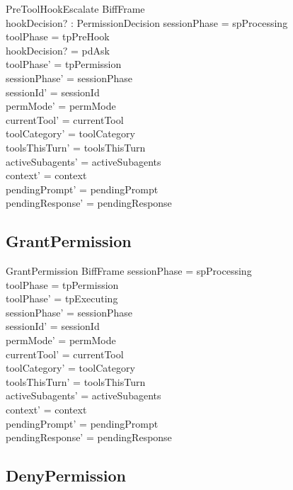 \documentclass[a4paper,10pt,fleqn]{article}
\begin{document}
\begin{schema}{PreToolHookEscalate}
  BiffFrame \\
  hookDecision? : PermissionDecision
  \where
  sessionPhase = spProcessing \\
  toolPhase = tpPreHook \\
  hookDecision? = pdAsk \\
  toolPhase' = tpPermission \\
  sessionPhase' = sessionPhase \\
  sessionId' = sessionId \\
  permMode' = permMode \\
  currentTool' = currentTool \\
  toolCategory' = toolCategory \\
  toolsThisTurn' = toolsThisTurn \\
  activeSubagents' = activeSubagents \\
  context' = context \\
  pendingPrompt' = pendingPrompt \\
  pendingResponse' = pendingResponse
\end{schema}

\subsection{GrantPermission}

\begin{schema}{GrantPermission}
  BiffFrame
  \where
  sessionPhase = spProcessing \\
  toolPhase = tpPermission \\
  toolPhase' = tpExecuting \\
  sessionPhase' = sessionPhase \\
  sessionId' = sessionId \\
  permMode' = permMode \\
  currentTool' = currentTool \\
  toolCategory' = toolCategory \\
  toolsThisTurn' = toolsThisTurn \\
  activeSubagents' = activeSubagents \\
  context' = context \\
  pendingPrompt' = pendingPrompt \\
  pendingResponse' = pendingResponse
\end{schema}

\subsection{DenyPermission}
\end{document}
